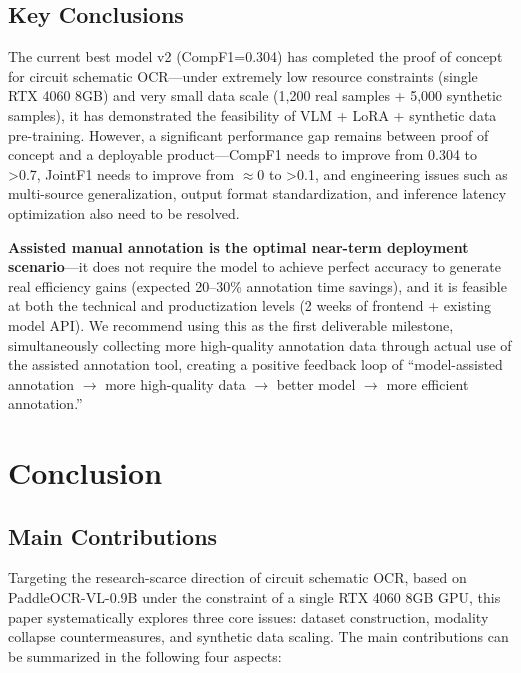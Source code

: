 \subsection{Key Conclusions}

The current best model v2 (CompF1=0.304) has completed the proof of concept for circuit schematic OCR---under extremely low resource constraints (single RTX 4060 8GB) and very small data scale (1,200 real samples + 5,000 synthetic samples), it has demonstrated the feasibility of VLM + LoRA + synthetic data pre-training. However, a significant performance gap remains between proof of concept and a deployable product---CompF1 needs to improve from 0.304 to >0.7, JointF1 needs to improve from $\approx$0 to >0.1, and engineering issues such as multi-source generalization, output format standardization, and inference latency optimization also need to be resolved.

\textbf{Assisted manual annotation is the optimal near-term deployment scenario}---it does not require the model to achieve perfect accuracy to generate real efficiency gains (expected 20--30\% annotation time savings), and it is feasible at both the technical and productization levels (2 weeks of frontend + existing model API). We recommend using this as the first deliverable milestone, simultaneously collecting more high-quality annotation data through actual use of the assisted annotation tool, creating a positive feedback loop of ``model-assisted annotation $\to$ more high-quality data $\to$ better model $\to$ more efficient annotation.''

\section{Conclusion}

\subsection{Main Contributions}

Targeting the research-scarce direction of circuit schematic OCR, based on PaddleOCR-VL-0.9B under the constraint of a single RTX 4060 8GB GPU, this paper systematically explores three core issues: dataset construction, modality collapse countermeasures, and synthetic data scaling. The main contributions can be summarized in the following four aspects:

